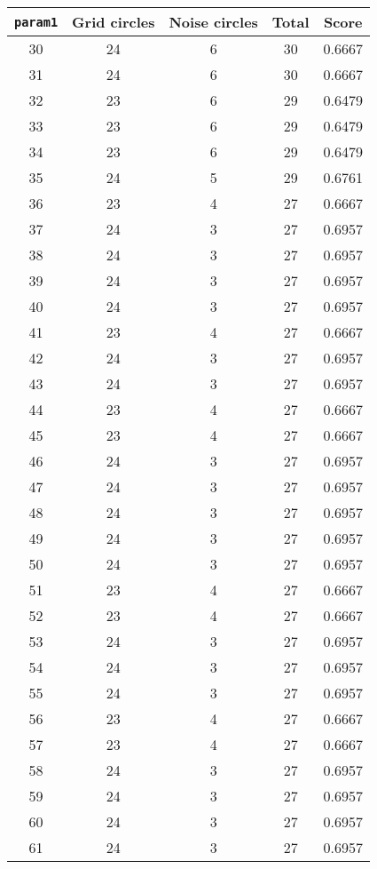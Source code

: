 \documentclass[letterpaper, 12pt]{article}
\begin{document}
\begin{longtable}{|c|c|c|c|c|}
\hline
\textbf{\texttt{param1}} & \textbf{Grid circles} & \textbf{Noise circles} & \textbf{Total} & \textbf{Score} \\
\hline
30 & 24 & 6 & 30 & 0.6667 \\
\hline
31 & 24 & 6 & 30 & 0.6667 \\
\hline
32 & 23 & 6 & 29 & 0.6479 \\
\hline
33 & 23 & 6 & 29 & 0.6479 \\
\hline
34 & 23 & 6 & 29 & 0.6479 \\
\hline
35 & 24 & 5 & 29 & 0.6761 \\
\hline
36 & 23 & 4 & 27 & 0.6667 \\
\hline
37 & 24 & 3 & 27 & 0.6957 \\
\hline
38 & 24 & 3 & 27 & 0.6957 \\
\hline
39 & 24 & 3 & 27 & 0.6957 \\
\hline
40 & 24 & 3 & 27 & 0.6957 \\
\hline
41 & 23 & 4 & 27 & 0.6667 \\
\hline
42 & 24 & 3 & 27 & 0.6957 \\
\hline
43 & 24 & 3 & 27 & 0.6957 \\
\hline
44 & 23 & 4 & 27 & 0.6667 \\
\hline
45 & 23 & 4 & 27 & 0.6667 \\
\hline
46 & 24 & 3 & 27 & 0.6957 \\
\hline
47 & 24 & 3 & 27 & 0.6957 \\
\hline
48 & 24 & 3 & 27 & 0.6957 \\
\hline
49 & 24 & 3 & 27 & 0.6957 \\
\hline
50 & 24 & 3 & 27 & 0.6957 \\
\hline
51 & 23 & 4 & 27 & 0.6667 \\
\hline
52 & 23 & 4 & 27 & 0.6667 \\
\hline
53 & 24 & 3 & 27 & 0.6957 \\
\hline
54 & 24 & 3 & 27 & 0.6957 \\
\hline
55 & 24 & 3 & 27 & 0.6957 \\
\hline
56 & 23 & 4 & 27 & 0.6667 \\
\hline
57 & 23 & 4 & 27 & 0.6667 \\
\hline
58 & 24 & 3 & 27 & 0.6957 \\
\hline
59 & 24 & 3 & 27 & 0.6957 \\
\hline
60 & 24 & 3 & 27 & 0.6957 \\
\hline
61 & 24 & 3 & 27 & 0.6957 \\

\end{longtable}
\end{document}
